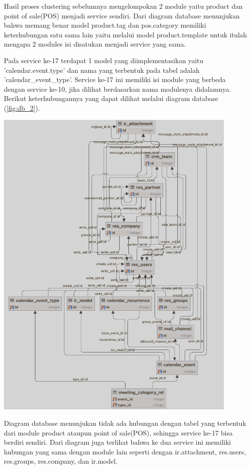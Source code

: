 Hasil proses clustering sebelumnya mengelompokan 2 module yaitu product dan point of sale(POS) menjadi service sendiri. Dari diagram database menunjukan bahwa memang benar model product.tag dan pos.category memiliki keterhubungan satu sama lain yaitu melalui model product.template untuk itulah mengapa 2 modules isi disatukan menjadi service yang sama.  

Pada service ke-17 terdapat 1 model yang diimplementasikan yaitu  'calendar.event.type' dan nama yang terbentuk pada tabel adalah 'calendar\_event\_type'. Service ke-17 ini memiliki isi module yang berbeda dengan service ke-10, jika dilihat berdasarkan nama modulenya didalamnya. Berikut keterhubungannya yang dapat dilihat melalui diagram database (\ref{fig:db_2}).

\begin{center}
	\includegraphics[width=12cm]{img/bab_4/db_2.png}
	\label{fig:db_2}
\end{center}

Diagram database menunjukan tidak ada hubungan dengan tabel yang terbentuk dari module product ataupun point of sale(POS), sehingga service ke-17 bisa berdiri sendiri. Dari diagram juga terlihat bahwa ke dua service ini memiliki hubungan yang sama dengan module lain seperti dengan ir.attachment, res.users, res.groups, res.company, dan ir.model. 
